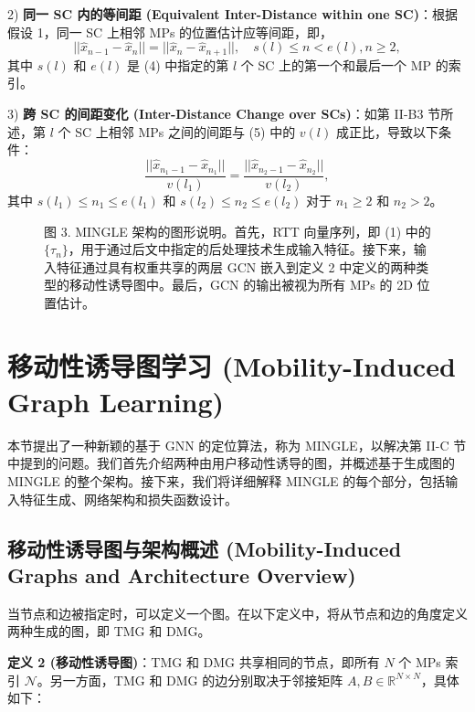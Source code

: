 \documentclass[journal]{IEEEtran}
\begin{document}
2) \textbf{同一 SC 内的等间距 (Equivalent Inter-Distance within one SC)}：根据假设 1，同一 SC 上相邻 MPs 的位置估计应等间距，即，
\begin{equation}
||\hat{x}_{n-1}-\hat{x}_{n}||=||\hat{x}_{n}-\hat{x}_{n+1}||, \quad s(l)\le n<e(l), n\ge2, \label{eq:8}
\end{equation}
其中 $s(l)$ 和 $e(l)$ 是 (4) 中指定的第 $l$ 个 SC 上的第一个和最后一个 MP 的索引。

3) \textbf{跨 SC 的间距变化 (Inter-Distance Change over SCs)}：如第 II-B3 节所述，第 $l$ 个 SC 上相邻 MPs 之间的间距与 (5) 中的 $v(l)$ 成正比，导致以下条件：
\begin{equation}
\frac{||\hat{x}_{n_{1}-1}-\hat{x}_{n_{1}}||}{v(l_{1})}=\frac{||\hat{x}_{n_{2}-1}-\hat{x}_{n_{2}}||}{v(l_{2})}, \label{eq:9}
\end{equation}
其中 $s(l_{1})\le n_{1}\le e(l_{1})$ 和 $s(l_{2})\le n_{2}\le e(l_{2})$ 对于 $n_{1}\ge2$ 和 $n_{2}>2$。

\begin{figure}[t]
\centering
\caption{图 3. MINGLE 架构的图形说明。首先，RTT 向量序列，即 (1) 中的 $\{\tau_{n}\}$，用于通过后文中指定的后处理技术生成输入特征。接下来，输入特征通过具有权重共享的两层 GCN 嵌入到定义 2 中定义的两种类型的移动性诱导图中。最后，GCN 的输出被视为所有 MPs 的 2D 位置估计。}
\label{fig:3}
\end{figure}

\section{移动性诱导图学习 (Mobility-Induced Graph Learning)}
本节提出了一种新颖的基于 GNN 的定位算法，称为 MINGLE，以解决第 II-C 节中提到的问题。我们首先介绍两种由用户移动性诱导的图，并概述基于生成图的 MINGLE 的整个架构。接下来，我们将详细解释 MINGLE 的每个部分，包括输入特征生成、网络架构和损失函数设计。

\subsection{移动性诱导图与架构概述 (Mobility-Induced Graphs and Architecture Overview)}
当节点和边被指定时，可以定义一个图。在以下定义中，将从节点和边的角度定义两种生成的图，即 TMG 和 DMG。

\textbf{定义 2 (移动性诱导图)}：TMG 和 DMG 共享相同的节点，即所有 $N$ 个 MPs 索引 $\mathcal{N}$。另一方面，TMG 和 DMG 的边分别取决于邻接矩阵 $A,B\in\mathbb{R}^{N\times N}$，具体如下：
\end{document}
